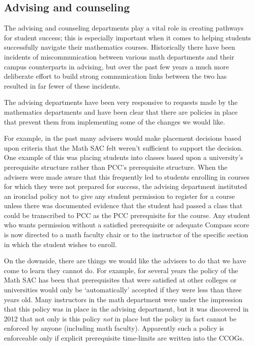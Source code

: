 \subsection{Advising and counseling}
The advising and counseling departments play a vital role in creating pathways for student success; this is especially important when it comes to helping students successfully navigate their mathematics courses.
Historically there have been incidents of miscommunication between various math departments and their campus counterparts in advising, but over the past few years a much more deliberate effort to build strong communication links  between the two has resulted in far fewer of these incidents.

The advising departments have been very responsive to requests made by the mathematics departments and have been clear that there are policies in place that prevent them from implementing some of the changes we would like.

For example, in the past many advisers would make placement decisions based upon criteria that the Math SAC felt weren't sufficient to support the decision.
One example of this was placing students into classes based upon a university's prerequisite structure rather than PCC's prerequisite structure.
When the advisers were made aware that this frequently led to students enrolling in courses for which they were not prepared for success, the advising department instituted an ironclad policy not to give any student permission to register for a course unless there was documented evidence that the student had passed a class that could be transcribed to PCC as the PCC prerequisite for the course.
Any student who wants permission without a satisfied prerequisite or adequate Compass score is now directed to a math faculty chair or to the instructor of the specific section in which the student wishes to enroll.

On the downside, there are things we would like the advisers to do that we have come to learn they cannot do.
For example, for several years the policy of the Math SAC has been that prerequisites that were satisfied at other colleges or universities would only be `automatically' accepted if they were less than three years old.
Many instructors in the math department were under the impression that this policy was in place in the advising department, but it was discovered in 2012 that not only is this policy \emph{not} in place but the policy in fact cannot be enforced by anyone (including math faculty).
Apparently such a policy is enforceable only if explicit prerequisite time-limits are written into the CCOGs.

